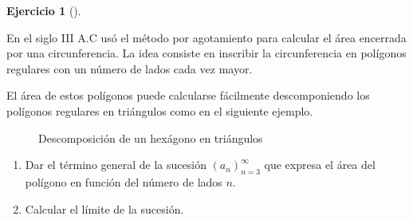 \documentclass[
  spanish,
  a4paper,
]{scrreport}
\theoremstyle{definition}
\newtheorem{exercise}{Ejercicio}[chapter]
\theoremstyle{remark}
\begin{document}
\begin{exercise}[]\protect\hypertarget{exr-2}{}\label{exr-2}

En el siglo III A.C usó el método por agotamiento para calcular el área
encerrada por una circunferencia. La idea consiste en inscribir la
circunferencia en polígonos regulares con un número de lados cada vez
mayor.

El área de estos polígonos puede calcularse fácilmente descomponiendo
los polígonos regulares en triángulos como en el siguiente ejemplo.

\begin{figure}
\centering

\caption{Descomposición de un hexágono en triángulos}
\end{figure}

\begin{enumerate}
\def\labelenumi{\alph{enumi}.}
\item
  Dar el término general de la sucesión \((a_n)_{n=3}^\infty\) que
  expresa el área del polígono en función del número de lados \(n\).
\item
  Calcular el límite de la sucesión.
\end{enumerate}

\end{exercise}
\end{document}
